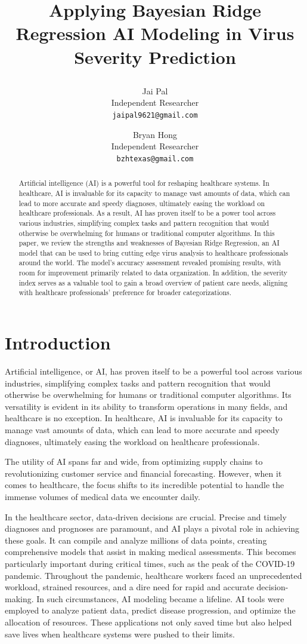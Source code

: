 \documentclass{article}
\title{Applying Bayesian Ridge Regression AI Modeling in Virus Severity Prediction

}
\author{
  Jai Pal \\
  Independent Researcher \\
  \texttt{jaipal9621@gmail.com}
  \and
  Bryan Hong \\
  Independent Researcher \\
  \texttt{bzhtexas@gmail.com}
}
\begin{document}
\maketitle

\begin{abstract}
Artificial intelligence (AI) is a powerful tool for reshaping healthcare systems. In healthcare, AI is invaluable for its capacity to manage vast amounts of data, which can lead to more accurate and speedy diagnoses, ultimately easing the workload on healthcare professionals. As a result, AI has proven itself to be a power tool across various industries, simplifying complex tasks and pattern recognition that would otherwise be overwhelming for humans or traditional computer algorithms. In this paper, we review the strengths and weaknesses of Bayesian Ridge Regression, an AI model that can be used to bring cutting edge virus analysis to healthcare professionals around the world. The model's accuracy assessment revealed promising results, with room for improvement primarily related to data organization. In addition, the severity index serves as a valuable tool to gain a broad overview of patient care needs, aligning with healthcare professionals' preference for broader categorizations.
\end{abstract}



\section{Introduction}
Artificial intelligence, or AI, has proven itself to be a powerful tool across various
industries, simplifying complex tasks and pattern recognition that would otherwise be
overwhelming for humans or traditional computer algorithms. Its versatility is evident in
its ability to transform operations in many fields, and healthcare is no exception. In
healthcare, AI is invaluable for its capacity to manage vast amounts of data, which can
lead to more accurate and speedy diagnoses, ultimately easing the workload on healthcare
professionals.

The utility of AI spans far and wide, from optimizing supply chains to
revolutionizing customer service and financial forecasting. However, when it comes to
healthcare, the focus shifts to its incredible potential to handle the immense volumes of
medical data we encounter daily.

In the healthcare sector, data-driven decisions are crucial. Precise and timely
diagnoses and prognoses are paramount, and AI plays a pivotal role in achieving these
goals. It can compile and analyze millions of data points, creating comprehensive models
that assist in making medical assessments. This becomes particularly important during
critical times, such as the peak of the COVID-19 pandemic.
Throughout the pandemic, healthcare workers faced an unprecedented workload,
strained resources, and a dire need for rapid and accurate decision-making. In such
circumstances, AI modeling became a lifeline. AI tools were employed to analyze patient
data, predict disease progression, and optimize the allocation of resources. These
applications not only saved time but also helped save lives when healthcare systems were
pushed to their limits.
\end{document}

